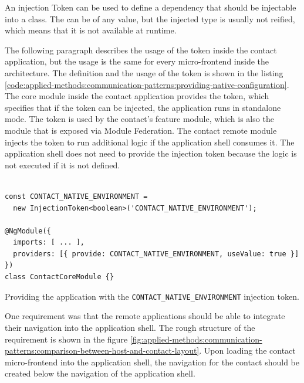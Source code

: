\noindent An injection Token can be used to define a dependency that should be injectable into a class. The can be of any value, but the injected type is usually not reified, which means that it is not available at runtime. \cite{misc:-:applied-methods:communication:angular-injection-token}


\bigskip

\noindent The following paragraph describes the usage of the token inside the contact application, but the usage is the same for every micro-frontend inside the architecture. The definition and the usage of the token is shown in the listing \ref{code:applied-methods:communication-patterns:providing-native-configuration}. The core module inside the contact application provides the token, which specifies that if the token can be injected, the application runs in standalone mode. The token is used by the contact's feature module, which is also the module that is exposed via Module Federation. The contact remote module injects the token to run additional logic if the application shell consumes it. The application shell does not need to provide the injection token because the logic is not executed if it is not defined.

\ifshowListings
  \begin{listing}[H]
  \begin{verbatim}

const CONTACT_NATIVE_ENVIRONMENT = 
  new InjectionToken<boolean>('CONTACT_NATIVE_ENVIRONMENT');

@NgModule({
  imports: [ ... ],
  providers: [{ provide: CONTACT_NATIVE_ENVIRONMENT, useValue: true }]
})
class ContactCoreModule {}
  \end{verbatim}
  \caption{Providing the application with the \texttt{CONTACT\_NATIVE\_ENVIRONMENT} injection token.}\label{code:applied-methods:communication-patterns:providing-native-configuration}
  \end{listing}
\fi

\noindent One requirement was that the remote applications should be able to integrate their navigation into the application shell. The rough structure of the requirement is shown in the figure \ref{fig:applied-methods:communication-patterns:comparison-between-host-and-contact-layout}. Upon loading the contact micro-frontend into the application shell, the navigation for the contact should be created below the navigation of the application shell.

